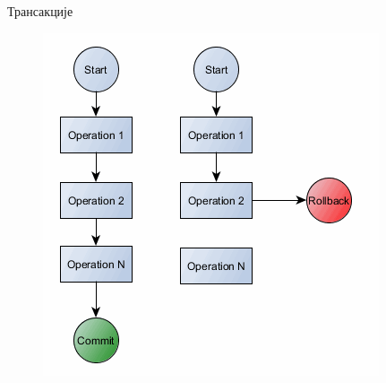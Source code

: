 \documentclass[aspectratio=169]{beamer}
\begin{document}
\begin{frame}[allowframebreaks]{Трансакције}
        \framebreak
        
        \begin{figure}
            \centering
            \includegraphics[width=\textwidth,height=0.8\textheight,keepaspectratio]{images/transaction.png}
            \label{fig:transaction}
        \end{figure}
    \end{frame}
    
\end{document}
